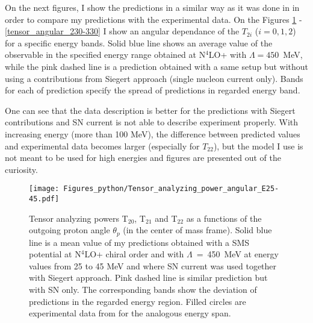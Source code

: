     
    On the next figures, I show the predictions in a similar way as it was done
    in \cite{rachek2007} in order to compare my predictions with the experimental
    data. On the Figures \ref{tensor_angular_25-45} - \ref{tensor_angular_230-330}
    I show an angular dependance of the $T_{2i}$ ($i=0,1,2$) for a specific energy bands.
    Solid blue line shows an average value of the observable in the specified energy range
    obtained at N$^4$LO+ with $\Lambda=450$~MeV, while the pink dashed line is a prediction
    obtained with a same setup but without using a contributions from Siegert approach
    (single nucleon current only). Bands for each of prediction specify the spread of
    predictions in regarded energy band.
    
    One can see that the data description is better for the predictions with Siegert contributions 
    and SN current is not able to describe experiment properly. With increasing energy 
    (more than 100 MeV),
    the difference between predicted values and experimental data becomes larger
    (especially for $T_{22}$), but the model I use is not meant to be used for high energies 
    and figures are presented out of the curiosity. 
    




    \begin{figure}[h]
        \begin{center}
        \texttt{[image: Figures\_python/Tensor\_analyzing\_power\_angular\_E25-45.pdf]}
        \end{center}
        \caption{Tensor analyzing powers T$_{20}$, T$_{21}$ and T$_{22}$ as a functions of the
        outgoing proton angle $\theta_p$ (in the center of mass frame).
        Solid blue line is a mean value of my predictions obtained with a
        SMS potential at N$^4$LO+ chiral order and with $\Lambda$~=~450~MeV
        at energy values from 25 to 45 MeV and
        where SN current was used together with Siegert approach. 
        Pink dashed line is similar prediction but with SN only. 
        The corresponding bands show the deviation of predictions in the regarded
        energy region.
        Filled circles are experimental data
        from \cite{rachek2007} for the analogous energy span.}
        \label{tensor_angular_25-45}
    \end{figure}

